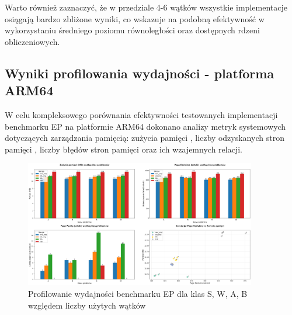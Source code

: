 Warto również zaznaczyć, że w przedziale 4-6 wątków wszystkie implementacje osiągają bardzo zbliżone wyniki, co wskazuje na podobną efektywność w wykorzystaniu średniego poziomu równoległości oraz dostępnych rdzeni obliczeniowych.

\subsection{Wyniki profilowania wydajności - platforma ARM64}
W celu kompleksowego porównania efektywności testowanych implementacji benchmarku EP na platformie ARM64 dokonano analizy metryk systemowych dotyczących zarządzania pamięcią: zużycia pamięci , liczby odzyskanych stron pamięci , liczby błędów stron pamięci  oraz ich wzajemnych relacji.
\begin{figure}[H]
    \centering
    \includegraphics[width=0.9\textwidth]{analiza/images/parallel/ep/arm/chart_01_memory_comparison.png}
    \caption{Profilowanie wydajności benchmarku EP dla klas S, W, A, B względem liczby użytych wątków}
    \label{ep_porownanie_zuzycia_pamieci}
\end{figure}
 


